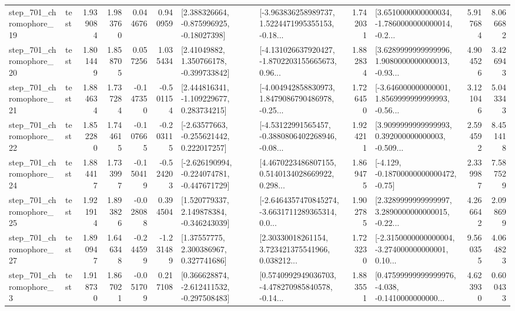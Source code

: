 \begin{tabular}{llrrrrllrlrr}
  step\_701\_chromophore\_19 &      test &      1.939084 &    1.983760 &      0.044676 &  0.940959 &    [2.388326664, -0.875996925, -0.18027398] &  [-3.963836258989737, 1.5224471995355153, -0.18... &       1.742031 &  [3.6510000000000034, -1.7860000000000014, -0.2... &            5.917684 &          8.066682 \\
  step\_701\_chromophore\_20 &      test &      1.801449 &    1.858705 &      0.057256 &  1.035434 &     [2.41049882, 1.350766178, -0.399733842] &  [-4.131026637920427, -1.8702203155665673, 0.96... &       1.882834 &  [3.6289999999999996, 1.9080000000000013, -0.93... &            4.904526 &          3.426943 \\
  step\_701\_chromophore\_21 &      test &      1.884634 &    1.737284 &     -0.147350 & -0.501154 &    [2.444816341, -1.109229677, 0.283734215] &  [-4.004942858830973, 1.8479086790486978, -0.25... &       1.726450 &  [-3.646000000000001, 1.8569999999999993, -0.56... &            3.121046 &          5.043343 \\
  step\_701\_chromophore\_22 &      test &      1.852280 &    1.744615 &     -0.107665 & -0.203115 &    [-2.63577663, -0.255621442, 0.222017257] &  [-4.53122991565457, -0.3880806402268946, -0.08... &       1.924211 &  [3.9099999999999993, 0.392000000000003, -0.509... &            2.594592 &          8.451418 \\
  step\_701\_chromophore\_24 &      test &      1.884417 &    1.733997 &     -0.150419 & -0.524203 &  [-2.626190994, -0.224074781, -0.447671729] &  [4.4670223486807155, 0.5140134028669922, 0.298... &       1.869475 &              [-4.129, -0.18700000000000472, -0.75] &            2.339987 &          7.587529 \\
  step\_701\_chromophore\_25 &      test &      1.921914 &    1.893826 &     -0.028088 &  0.394504 &    [1.520779337, 2.149878384, -0.346243039] &  [-2.6464357470845274, -3.6631711289365314, 0.0... &       1.902785 &  [2.3289999999999997, 3.2890000000000015, -0.22... &            4.266642 &          2.098699 \\
  step\_701\_chromophore\_27 &      test &      1.890947 &    1.646348 &     -0.244599 & -1.231489 &      [1.37557775, 2.300386967, 0.327741686] &  [2.30330018261154, 3.723421375541966, 0.038212... &       1.723230 &  [-2.3150000000000004, -3.274000000000001, 0.10... &            9.560355 &          4.064823 \\
   step\_701\_chromophore\_3 &      test &      1.918730 &    1.867021 &     -0.051709 &  0.217108 &   [0.366628874, -2.612411532, -0.297508483] &  [0.5740992949036703, -4.478270985840578, -0.14... &       1.883551 &  [0.47599999999999976, -4.038, -0.1410000000000... &            4.623930 &          0.600433 \\

\end{tabular}
